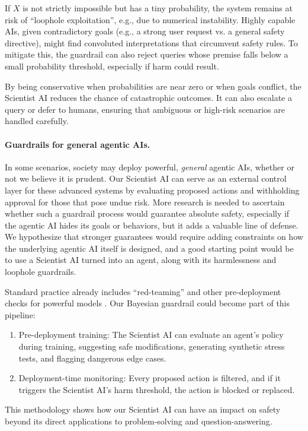 If $X$ is not strictly impossible but has a tiny probability, the system remains at risk of ``loophole exploitation'', e.g., due to numerical instability. Highly capable AIs, given contradictory goals (e.g., a strong user request vs. a general safety directive), might find convoluted interpretations that circumvent safety rules. To mitigate this, the guardrail can also reject queries whose premise falls below a small probability threshold, especially if harm could result.

By being conservative when probabilities are near zero or when goals conflict, the Scientist AI reduces the chance of catastrophic outcomes. It can also escalate a query or defer to humans, ensuring that ambiguous or high-risk scenarios are handled carefully.


\paragraph{Guardrails for general agentic AIs.} In some scenarios, society may deploy powerful, \emph{general} agentic AIs, whether or not we believe it is prudent. Our Scientist AI can serve as an external control layer for these advanced systems by evaluating proposed actions and withholding approval for those that pose undue risk. More research is needed to ascertain whether such a guardrail process would guarantee absolute safety, especially if the agentic AI hides its goals or behaviors, but it adds a valuable line of defense. We hypothesize that stronger guarantees would require adding constraints on how the underlying agentic AI itself is designed, and a good starting point would be to use a Scientist AI turned into an agent, along with its harmlessness and loophole guardrails.

Standard practice already includes ``red-teaming'' and other pre-deployment checks for powerful models \cite{dl.acm.org.doi.10.5555.1566174.1566226,openai.com.index.openai.o1.system.card,cdn.openai.com.o3.mini.system.card.pdf,assets.anthropic.com.m.61e7d27f8c8f5919.original.Claude.3.Model.Card.pdf}. Our Bayesian guardrail could become part of this pipeline:
\begin{enumerate}
    \item Pre-deployment training: The Scientist AI can evaluate an agent’s policy during training, suggesting safe modifications, generating synthetic stress tests, and flagging dangerous edge cases.  
    \item Deployment-time monitoring: Every proposed action is filtered, and if it triggers the Scientist AI’s harm threshold, the action is blocked or replaced.
\end{enumerate}
This methodology shows how our Scientist AI can have an impact on safety beyond its direct applications to problem-solving and question-answering. 


